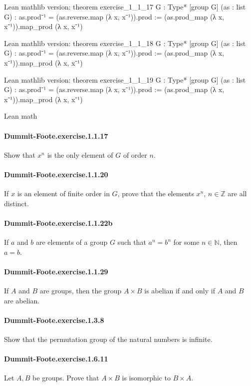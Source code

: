 \documentclass{article}
\begin{document}
Lean mathlib version:
theorem exercise_1_1_17 {G : Type*} [group G] (as : list G) :
  as.prod⁻¹ = (as.reverse.map (λ x, x⁻¹)).prod :=
(as.prod_map (λ x, x⁻¹)).map_prod (λ x, x⁻¹)

Lean mathlib version:
theorem exercise_1_1_18 {G : Type*} [group G] (as : list G) :
  as.prod⁻¹ = (as.reverse.map (λ x, x⁻¹)).prod :=
(as.prod_map (λ x, x⁻¹)).map_prod (λ x, x⁻¹)

Lean mathlib version:
theorem exercise_1_1_19 {G : Type*} [group G] (as : list G) :
  as.prod⁻¹ = (as.reverse.map (λ x, x⁻¹)).prod :=
(as.prod_map (λ x, x⁻¹)).map_prod (λ x, x⁻¹)

Lean math

\paragraph{Dummit-Foote.exercise.1.1.17} Show that $x^n$ is the only element of $G$ of order $n$.

\paragraph{Dummit-Foote.exercise.1.1.20} If $x$ is an element of finite order in $G$, prove that the elements $x^n$, $n\in\mathbb{Z}$ are all distinct.

\paragraph{Dummit-Foote.exercise.1.1.22b} If $a$ and $b$ are elements of a group $G$ such that $a^n = b^n$ for some $n \in \mathbb{N}$, then $a = b$.

\paragraph{Dummit-Foote.exercise.1.1.29} If $A$ and $B$ are groups, then the group $A × B$ is abelian if and only if $A$ and $B$ are abelian.

\paragraph{Dummit-Foote.exercise.1.3.8} Show that the permutation group of the natural numbers is infinite.

\paragraph{Dummit-Foote.exercise.1.6.11} Let $A, B$ be groups. Prove that $A × B$ is isomorphic to $B × A$.
\end{document}
